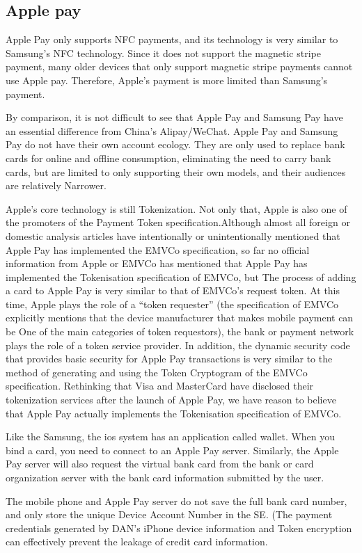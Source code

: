 \documentclass[journal]{IEEEtran}
\begin{document}
\subsection{Apple pay}
Apple Pay only supports NFC payments, and its technology is very similar to Samsung's NFC technology. Since it does not support the magnetic stripe payment, many older devices that only support magnetic stripe payments cannot use Apple pay. Therefore, Apple's payment is more limited than Samsung's payment.

By comparison, it is not difficult to see that Apple Pay and Samsung Pay have an essential difference from China’s Alipay/WeChat. Apple Pay and Samsung Pay do not have their own account ecology. They are only used to replace bank cards for online and offline consumption, eliminating the need to carry bank cards, but are limited to only supporting their own models, and their audiences are relatively Narrower.

Apple's core technology is still Tokenization. Not only that, Apple is also one of the promoters of the Payment Token specification.Although almost all foreign or domestic analysis articles have intentionally or unintentionally mentioned that Apple Pay has implemented the EMVCo specification, so far no official information from Apple or EMVCo has mentioned that Apple Pay has implemented the Tokenisation specification of EMVCo, but The process of adding a card to Apple Pay is very similar to that of EMVCo's request token. At this time, Apple plays the role of a “token requester” (the specification of EMVCo explicitly mentions that the device manufacturer that makes mobile payment can be One of the main categories of token requestors), the bank or payment network plays the role of a token service provider. In addition, the dynamic security code that provides basic security for Apple Pay transactions is very similar to the method of generating and using the Token Cryptogram of the EMVCo specification. Rethinking that Visa and MasterCard have disclosed their tokenization services after the launch of Apple Pay, we have reason to believe that Apple Pay actually implements the Tokenisation specification of EMVCo.

Like the Samsung, the ios system has an application called wallet. When you bind a card, you need to connect to an Apple Pay server. Similarly, the Apple Pay server will also request the virtual bank card from the bank or card organization server with the bank card information submitted by the user.

The mobile phone and Apple Pay server do not save the full bank card number, and only store the unique Device Account Number in the SE. (The payment credentials generated by DAN's iPhone device information and Token encryption can effectively prevent the leakage of credit card information.
\end{document}
